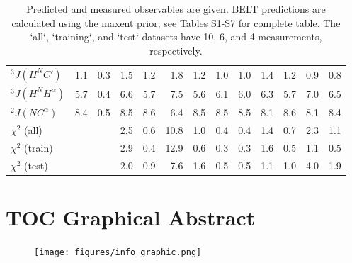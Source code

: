 \documentclass[journal=jacsat,manuscript=article]{achemso}
\begin{document}
\begin{table}
\begin{tabular}{lrrrrrrrrrrrr}
$^3J(H^NC\prime)$ &  1.1 &          0.3 &      1.5 &             1.2 &      1.8 &             1.2 &                1.0 &                       1.0 &       1.4 &              1.2 &     0.9 &            0.8 \\
$^3J(H^NH^\alpha)$     &  5.7 &          0.4 &      6.6 &             5.7 &      7.5 &             5.6 &                6.1 &                       6.0 &       6.3 &              5.7 &     7.0 &            6.5 \\
$^2J(NC^\alpha)$      &  8.4 &          0.5 &      8.5 &             8.6 &      6.4 &             8.5 &                8.5 &                       8.5 &       8.1 &              8.6 &     8.1 &            8.4 \\
$\chi^2$ (all)                           &    &            &      2.5 &             0.6 &     10.8 &             1.0 &                0.4 &                       0.4 &       1.4 &              0.7 &     2.3 &            1.1 \\
$\chi^2$ (train)                         &    &            &      2.9 &             0.4 &     12.9 &             0.6 &                0.3 &                       0.3 &       1.6 &              0.5 &     1.1 &            0.5 \\
$\chi^2$ (test)                          &    &            &      2.0 &             0.9 &      7.6 &             1.6 &                0.5 &                       0.5 &       1.1 &              1.0 &     4.0 &            1.9 \\
\bottomrule
\end{tabular}
\caption{
Predicted and measured observables are given.  BELT predictions are calculated using the maxent prior; see Tables S1-S7 for complete table.  The `all`, `training`, and `test` datasets have 10, 6, and 4 measurements, respectively.  
}
\label{table:Predictions}
\end{table}

\clearpage




\clearpage

\section{TOC Graphical Abstract}

\begin{figure}

\texttt{[image: figures/info\_graphic.png]}

\end{figure}
\end{document}
